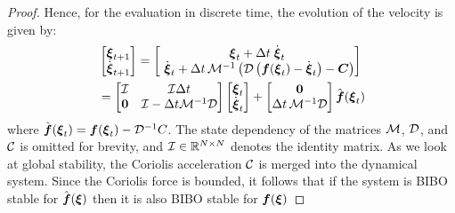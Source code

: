 \begin{proof}
Hence, for the evaluation in discrete time, the evolution of the velocity is given by:
\begin{equation}
	\begin{split}
	& \begin{bmatrix}
	 \vecs \xi_{t+1} \\ \dot{\vecs \xi}_{t+1}
	\end{bmatrix}
	=
	\begin{bmatrix}
		\vect \xi_t + \Delta t  \; \dot{\vect \xi}_t \\ \
		\dot{\vecs \xi}_t + \Delta t \, \matd{M}^{-1} \left( \matd{D} \left( \vect f(\vecs \xi_t) - \dot{\vecs \xi}_t \right) - \matr C \right)
	\end{bmatrix} \\
	&  = %
	\begin{bmatrix}
		\mathcal{I} & \mathcal{I} \Delta t \\
		\vect{0} & \mathcal{I} - \Delta t \matd{M}^{-1} \matd D 
	\end{bmatrix}
	\begin{bmatrix}
		\vect \xi_t \\ \dot{\vect \xi}_t
	\end{bmatrix}
	+ \begin{bmatrix}
		\vect{0} \\ 
		\Delta t \, \matd{M}^{-1} \matd{D} 
	\end{bmatrix}
	\hat{\vect f}(\vecs \xi_t) 
	\label{eq:discrete_time_proof}
	\end{split}
\end{equation}
where $\hat{\boldsymbol{f}}(\boldsymbol{\xi}_t) = \boldsymbol{f}(\boldsymbol{\xi}_t) - \mathcal{D}^{-1} C$.  The state dependency of the matrices $\mathcal{M}$, $\mathcal{D}$, and $\mathcal{C}$ is omitted for brevity, and $\mathcal{I} \in \mathbb{R}^{N \times N}$ denotes the identity matrix.
As we look at global stability, the Coriolis acceleration $\mathcal{C}$ is merged into the dynamical system. Since the Coriolis force is bounded, it follows that if the system is BIBO stable for $\hat{\boldsymbol{f}}(\boldsymbol{\xi})$ then it is also BIBO stable for $\boldsymbol{f}(\boldsymbol{\xi})$ 


\end{proof}
